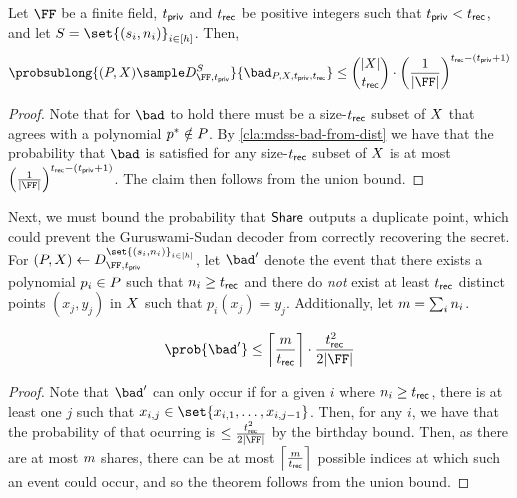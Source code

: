 \begin{lemma}
	\label{lem:mdss-corr-bound}
	Let $\FF$ be a finite field, $t_{\mathsf{priv}}$ and $t_{\mathsf{rec}}$ be positive integers such that $t_{\mathsf{priv}} < t_{\mathsf{rec}}$, and let  $S = \set{(\mdssSecret_i, \mdssNumShares_i)}_{i \in [\mdssNumShareSets]}$.
	Then,
	$$
		\probsublong{(\mdssPolySet, \mdssPointSet) \sample \mdssHonestDist{\FF}{\mdssPrivThr}{S}}{\bad_{\mdssPolySet, \mdssPointSet, \mdssPrivThr, \mdssRecThr}} \leq \binom{|\mdssPointSet|}{\mdssRecThr} \cdot \mdssFieldBound
	$$
\end{lemma}
\begin{proof}
	Note that for $\bad$ to hold there must be a size-$t_{\mathsf{rec}}$ subset of $X$ that agrees with a polynomial $p^* \notin P$.
	By \cref{cla:mdss-bad-from-dist} we have that the probability that $\bad$ is satisfied for any size-$t_{\mathsf{rec}}$ subset of $X$ is at most $\mdssFieldBound$.
	The claim then follows from the union bound.
\end{proof}

Next, we must bound the probability that $\mathsf{Share}$ outputs a duplicate point, which could prevent the Guruswami-Sudan decoder from correctly recovering the secret.
For $(\mdssPolySet, \mdssPointSet) \gets \mdssHonestDist{\FF}{\mdssPrivThr}{\set{(\mdssSecret_i, \mdssNumShares_i)}_{i \in [\mdssNumShareSets]}}$, let $\bad'$ denote the event that there exists a polynomial $p_i \in P$ such that $n_i \geq t_{\mathsf{rec}}$ and there do \emph{not} exist at least $t_{\mathsf{rec}}$ distinct points $(x_j, y_j)$ in $X$ such that $p_i(x_j) = y_j$.
Additionally, let $m = \sum_i n_i$.
\begin{lemma}
	\label{lem:mdss-bad-prime-bound}
	$$
		\prob{\bad'} \leq \left\lceil\frac{\mdssMaxShares}{\mdssRecThr}\right\rceil \cdot \frac{\mdssRecThr^2}{2|\FF|}
	$$
\end{lemma}
\begin{proof}
	Note that $\bad'$ can only occur if for a given $i$ where $n_i \geq t_{\mathsf{rec}}$, there is at least one $j$ such that $x_{i, j} \in \set{x_{i, 1},\dots,x_{i, j-1}}$.
	Then, for any $i$, we have that the probability of that ocurring is $\leq \frac{\mdssRecThr^2}{2|\FF|}$ by the birthday bound.
	Then, as there are at most $m$ shares, there can be at most $\left\lceil\frac{m}{t_{\mathsf{rec}}}\right\rceil$ possible indices at which such an event could occur, and so the theorem follows from the union bound.
\end{proof}



